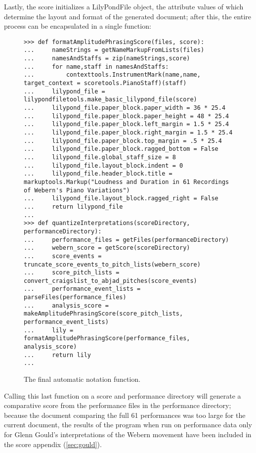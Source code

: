 Lastly, the score initializes a LilyPondFile object, the attribute values of which determine the layout and format of the generated document; after this, the entire process can be encapsulated in a single function:

\begin{figure}[H]
\begin{lstlisting}[basicstyle=\scriptsize\ttfamily, breaklines=True, tabsize=4, showtabs=false, showspaces=false]
>>> def formatAmplitudePhrasingScore(files, score):
...     nameStrings = getNameMarkupFromLists(files)
...     namesAndStaffs = zip(nameStrings,score)
...     for name,staff in namesAndStaffs:
...         contexttools.InstrumentMark(name,name, target_context = scoretools.PianoStaff)(staff)
...     lilypond_file = lilypondfiletools.make_basic_lilypond_file(score)
...     lilypond_file.paper_block.paper_width = 36 * 25.4
...     lilypond_file.paper_block.paper_height = 48 * 25.4
...     lilypond_file.paper_block.left_margin = 1.5 * 25.4
...     lilypond_file.paper_block.right_margin = 1.5 * 25.4
...     lilypond_file.paper_block.top_margin = .5 * 25.4
...     lilypond_file.paper_block.ragged_bottom = False
...     lilypond_file.global_staff_size = 8
...     lilypond_file.layout_block.indent = 0
...     lilypond_file.header_block.title = markuptools.Markup("Loudness and Duration in 61 Recordings of Webern's Piano Variations")
...     lilypond_file.layout_block.ragged_right = False
...     return lilypond_file
... 
>>> def quantizeInterpretations(scoreDirectory, performanceDirectory):
...     performance_files = getFiles(performanceDirectory)
...     webern_score = getScore(scoreDirectory)
...     score_events = truncate_score_events_to_pitch_lists(webern_score)
...     score_pitch_lists = convert_craigslist_to_abjad_pitches(score_events)
...     performance_event_lists = parseFiles(performance_files)
...     analysis_score = makeAmplitudePhrasingScore(score_pitch_lists, performance_event_lists)
...     lily = formatAmplitudePhrasingScore(performance_files, analysis_score)
...     return lily
... \end{lstlisting}

\caption{The final automatic notation function. } 
\end{figure}

Calling this last function on a score and performance directory will generate a comparative score from the performance files in the performance directory; because the document comparing the full 61 performances was too large for the current document, the results of the program when run on performance data only for Glenn Gould's interpretations of the Webern movement have been included in the score appendix (\ref{sec:gould}).

